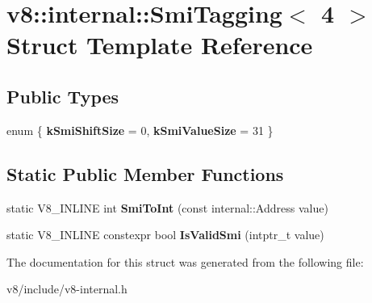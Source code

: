 \hypertarget{structv8_1_1internal_1_1SmiTagging_3_014_01_4}{}\section{v8\+:\+:internal\+:\+:Smi\+Tagging$<$ 4 $>$ Struct Template Reference}
\label{structv8_1_1internal_1_1SmiTagging_3_014_01_4}
\subsection*{Public Types}
\begin{DoxyCompactItemize}
\item 
\mbox{\label{structv8_1_1internal_1_1SmiTagging_3_014_01_4_aa2b64cedd7f894f6964fe11746b029e4}} 
enum \{ {\bfseries k\+Smi\+Shift\+Size} = 0, 
{\bfseries k\+Smi\+Value\+Size} = 31
 \}
\end{DoxyCompactItemize}
\subsection*{Static Public Member Functions}
\begin{DoxyCompactItemize}
\item 
\mbox{\label{structv8_1_1internal_1_1SmiTagging_3_014_01_4_ad306fdee17af069303cc78be3defa400}} 
static V8\+\_\+\+I\+N\+L\+I\+NE int {\bfseries Smi\+To\+Int} (const internal\+::\+Address value)
\item 
\mbox{\label{structv8_1_1internal_1_1SmiTagging_3_014_01_4_af100af8e269bbeee8c7e12b28d388b4e}} 
static V8\+\_\+\+I\+N\+L\+I\+NE constexpr bool {\bfseries Is\+Valid\+Smi} (intptr\+\_\+t value)
\end{DoxyCompactItemize}


The documentation for this struct was generated from the following file\+:\begin{DoxyCompactItemize}
\item 
v8/include/v8-\/internal.\+h\end{DoxyCompactItemize}

